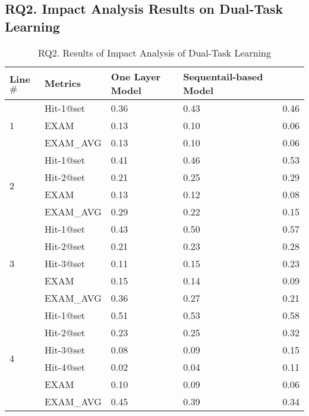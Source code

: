 \subsection{\bf RQ2. Impact Analysis Results on Dual-Task Learning}

\iffalse

\begin{table}[b]
	\caption{RQ2. Results of Impact Analysis of Dual-Task Learning}
        \vspace{-12pt}
	{\small
		\begin{center}
			\renewcommand{\arraystretch}{1}
			\begin{tabular}{p{1cm}<{\centering}|p{1.5cm}<{\centering}|p{1.5cm}<{\centering}|p{1.5cm}<{\centering}|p{1.2cm}<{\centering}}
				\hline
				Line$\#$ & Metrics & One Layer Model & Sequentail-based Model & \tool \\
				\hline
				\multirow{3}{*}{1}  & Hit-1@set     & 0.36 & 0.43 & 0.46  \\
									& EXAM          & 0.13 & 0.10 & 0.06  \\
									& EXAM\_AVG     & 0.13 & 0.10 & 0.06  \\
				\hline
				\multirow{4}{*}{2}  & Hit-1@set     & 0.41 & 0.46 & 0.53  \\
									& Hit-2@set     & 0.21 & 0.25 & 0.29  \\
									& EXAM          & 0.13 & 0.12 & 0.08  \\
									& EXAM\_AVG     & 0.29 & 0.22 & 0.15 \\
				\hline
				\multirow{5}{*}{3}  & Hit-1@set     & 0.43 & 0.50 & 0.57 \\
									& Hit-2@set     & 0.21 & 0.23 & 0.28 \\
									& Hit-3@set     & 0.11 & 0.15 & 0.23 \\
									& EXAM          & 0.15 & 0.14 & 0.09 \\
									& EXAM\_AVG     & 0.36 & 0.27 & 0.21 \\
				\hline
				\multirow{6}{*}{4}  & Hit-1@set     & 0.51 & 0.53 & 0.58 \\
									& Hit-2@set     & 0.23 & 0.25 & 0.32 \\
									& Hit-3@set     & 0.08 & 0.09 & 0.15 \\
									& Hit-4@set     & 0.02 & 0.04 & 0.11 \\
									& EXAM          & 0.10 & 0.09 & 0.06 \\
									& EXAM\_AVG     & 0.45 & 0.39 & 0.34 \\

\end{tabular}
\end{center}}
\end{table}
